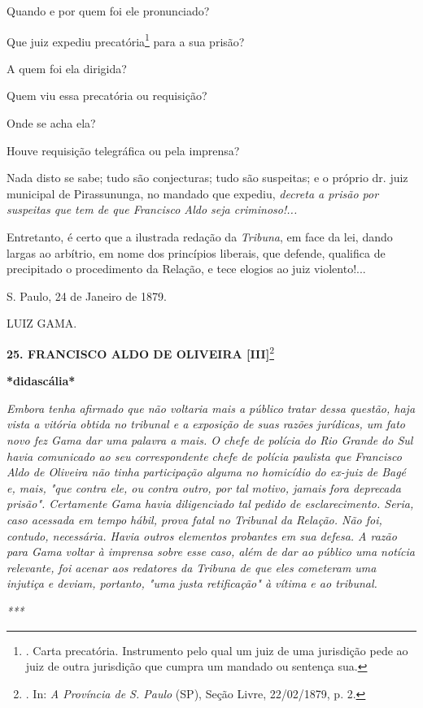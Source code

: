 Quando e por quem foi ele pronunciado?

Que juiz expediu precatória\footnote{. Carta precatória. Instrumento
  pelo qual um juiz de uma jurisdição pede ao juiz de outra jurisdição
  que cumpra um mandado ou sentença sua.}
par\protect\hypertarget{Secao_Sem_Titulo-33}{}{}a a sua prisão?

A quem foi ela dirigida?

Quem viu essa precatória ou requisição?

Onde se acha ela?

Houve requisição telegráfica ou pela imprensa?

Nada disto se sabe; tudo são conjecturas; tudo são suspeitas; e o
próprio dr. juiz municipal de Pirassununga, no mandado que expediu,
\emph{decreta a prisão por suspeitas que tem de que Francisco Aldo seja
criminoso!...}

Entretanto, é certo que a ilustrada redação da \emph{Tribuna}, em face
da lei, dando largas ao arbítrio, em nome dos princípios liberais, que
defende, qualifica de precipitado o procedimento da Relação, e tece
elogios ao juiz violento!...

S. Paulo, 24 de Janeiro de 1879.

LUIZ GAMA.

\textbf{25. FRANCISCO ALDO DE OLIVEIRA {[}III{]}}\footnote{. In: \emph{A
  Província de S. Paulo} (SP), Seção Livre, 22/02/1879, p. 2.}

\textbf{*didascália*}

\emph{Embora tenha afirmado que não voltaria mais a público tratar dessa
questão, haja vista a vitória obtida no tribunal e a exposição de suas
razões jurídicas, um fato novo fez Gama dar uma palavra a mais. O chefe
de polícia do Rio Grande do Sul havia comunicado ao seu correspondente
chefe de polícia paulista que Francisco Aldo de Oliveira não tinha
participação alguma no homicídio do ex-juiz de Bagé e, mais, "que contra
ele, ou contra outro, por tal motivo, jamais fora deprecada prisão".
Certamente Gama havia diligenciado tal pedido de esclarecimento. Seria,
caso acessada em tempo hábil, prova fatal no Tribunal da Relação. Não
foi, contudo, necessária. Havia outros elementos probantes em sua
defesa. A razão para Gama voltar à imprensa sobre esse caso, além de dar
ao público uma notícia relevante, foi acenar aos redatores da Tribuna de
que eles cometeram uma injutiça e deviam, portanto, "uma justa
retificação" à vítima e ao tribunal. }

\emph{***}

